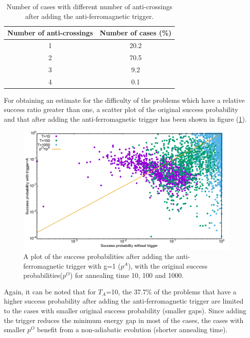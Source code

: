 \documentclass[../main.tex]{subfiles}
\begin{document}
\begin{table}[H]
\centering
\renewcommand{\arraystretch}{1.5}
\begin{tabular}{|c|c|}
\hline 
Number of anti-crossings & Number of cases (\%) \\ 
\hline 
1 & 20.2 \\ 
\hline 
2 & 70.5 \\ 
\hline 
3 & 9.2 \\ 
\hline 
4 & 0.1 \\ 
\hline 
\end{tabular} 
\caption{Number of cases with different number of anti-crossings after adding the anti-ferromagnetic trigger.}
\label{tab:a4}

\end{table}
For obtaining an estimate for the difficulty of the problems which have a relative success ratio greater than one, a scatter plot of the original success probability and that after adding the anti-ferromagnetic trigger has been shown in figure (\ref{fig:a22}).


\begin{figure}[H]
\centering 
\includegraphics[scale=0.3]{ProbScat_g1.png}
\caption{A plot of the success probabilities after adding the anti-ferromagnetic trigger with g=1 ($p^A$), with the original success probabilities($p^O$) for annealing time 10, 100 and 1000.}
\label{fig:a22}
\end{figure}

Again, it can be noted that for $T_A$=10, the 37.7\% of the problems that have a higher success probability after adding the anti-ferromagnetic trigger are limited to the cases with smaller original success probability (smaller gaps). Since adding the trigger reduces the minimum energy gap in most of the cases, the cases with smaller $p^O$ benefit from a non-adiabatic evolution (shorter annealing time).\\
\end{document}
